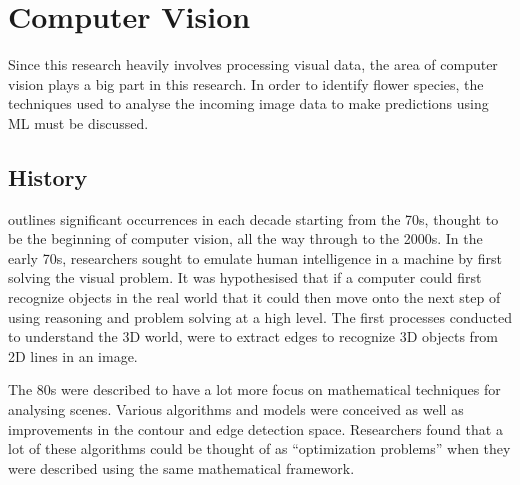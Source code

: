 \documentclass[12pt,a4paper]{report}
\begin{document}
\section{Computer Vision}

Since this research heavily involves processing visual data, the area of computer vision plays a big part in this 
research. In order to identify flower species, the techniques used to analyse the incoming image data to make 
predictions using ML must be discussed.

\subsection{History}

\citet{SzeliskiRichard2011CV:A} outlines significant occurrences in each decade starting from the 70s, 
thought to be the beginning of computer vision, all the way through to the 2000s. In the early 70s, researchers sought 
to emulate human intelligence in a machine by first solving the visual problem. It was hypothesised that if a computer 
could first recognize objects in the real world that it could then move onto the next step of using reasoning and 
problem solving at a high level. The first processes conducted to understand the 3D world, were to extract edges to 
recognize 3D objects from 2D lines in an image.

\par

The 80s were described to have a lot more focus on mathematical techniques for analysing scenes. Various algorithms 
and models were conceived as well as improvements in the contour and edge detection space. Researchers found that a 
lot of these algorithms could be thought of as “optimization problems” when they were described using the same 
mathematical framework.

\par
\end{document}
